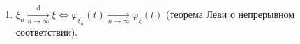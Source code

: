 \begin{namedthm}
\begin{enumerate}
            Дискретное распределение:
            \begin{equation*}
                \MyPr(\xi=k)=\frac{1}{2 \pi} \int\limits_{-\pi}^{\pi} e^{-i t k} \varphi_{\xi}(t) d t, \quad k \in \Integer.
            \end{equation*}
            Абсолютно непрерывное распределение:
            \begin{equation*}
                f_{\xi}(x)=\frac{1}{2 \pi} \int\limits_{-\infty}^{\infty} e^{-i t x} \varphi_{\xi}(t) d t, \quad x \in \Real.
            \end{equation*}
        \item 
            $\xi_n \xrightarrow[n \to \infty]{\text{d}} \xi \iff \varphi_{\xi_{n}}(t) \xrightarrow[n \to \infty]{} \varphi_{\xi}(t)$ (теорема Леви о непрерывном соответствии).
    \end{enumerate}
\end{namedthm}

